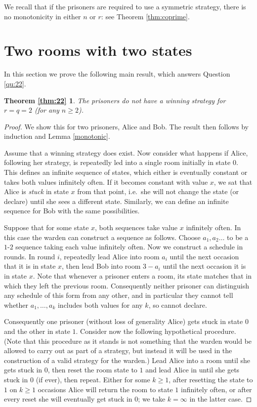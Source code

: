 \documentclass[a4paper,11pt]{extarticle}
\newtheorem*{thmone}{Theorem \ref{thm:22}}
\theoremstyle{definition}
\theoremstyle{remark}
\newcommand{\ie}{i.e.\ }
\begin{document}
	We recall that if the prisoners are required to use a symmetric strategy, there is no monotonicity in either $n$ or $r$: see Theorem \ref{thm:coprime}.
	
	\section{Two rooms with two states}\label{sec:22}
	In this section we prove the following main result, which answers Question \ref{qu:22}.
	
	\begin{thmone}
		The prisoners do not have a winning strategy for $r=q=2$ (for any $n\geq 2$).
	\end{thmone}
	\begin{proof}We show this for two prisoners, Alice and Bob. The result then follows by induction and Lemma \ref{monotonic}.
		
		Assume that a winning strategy does exist. Now consider what happens if Alice, following her strategy, is repeatedly led into a single room initially in state $0$. This defines an infinite sequence of states, which either is eventually constant or takes both values infinitely often. If it becomes constant with value $x$, we sat that Alice is \textit{stuck} in state $x$ from that point, \ie she will not change the state (or declare) until she sees a different state. Similarly, we can define an infinite sequence for Bob with the same possibilities.
		
		Suppose that for some state $x$, both sequences take value $x$ infinitely often. In this case the warden can construct a sequence as follows. Choose $a_1,a_2\ldots$ to be a $1$-$2$ sequence taking each value infinitely often. Now we construct a schedule in rounds. In round $i$, repeatedly lead Alice into room $a_i$ until the next occasion that it is in state $x$, then lead Bob into room $3-a_i$ until the next occasion it is in state $x$. Note that whenever a prisoner enters a room, its state matches that in which they left the previous room. Consequently neither prisoner can distinguish any schedule of this form from any other, and in particular they cannot tell whether $a_1,\ldots, a_k$ includes both values for any $k$, so cannot declare.
		
		Consequently one prisoner (without loss of generality Alice) gets stuck in state $0$ and the other in state $1$. Consider now the following hypothetical procedure. (Note that this procedure as it stands is not something that the warden would be allowed to carry out as part of a strategy, but instead it will be used in the construction of a valid strategy for the warden.) Lead Alice into a room until she gets stuck in $0$, then reset the room state to $1$ and lead Alice in until she gets stuck in $0$ (if ever), then repeat. Either for some $k\geq 1$, after resetting the state to $1$ on $k\geq 1$ occasions Alice will return the room to state $1$ infinitely often, or after every reset she will eventually get stuck in $0$; we take $k=\infty$ in the latter case.
		

\end{proof}
\end{document}
